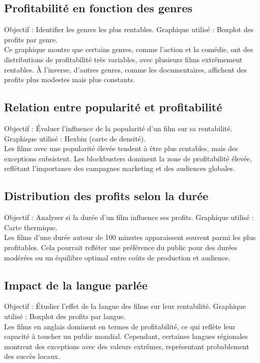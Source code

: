 \documentclass{article}
\begin{document}
\subsection*{Profitabilité en fonction des genres}
Objectif : Identifier les genres les plus rentables.
Graphique utilisé : Boxplot des profits par genre. \\
Ce graphique montre que certains genres, comme l’action et la comédie, ont des distributions de profitabilité très variables, avec plusieurs films extrêmement rentables. À l’inverse, d'autres genres, comme les documentaires, affichent des profits plus modestes mais plus constants.

\subsection*{Relation entre popularité et profitabilité}
Objectif : Évaluer l’influence de la popularité d’un film sur sa rentabilité.
Graphique utilisé : Hexbin (carte de densité).\\
Les films avec une popularité élevée tendent à être plus rentables, mais des exceptions subsistent. Les blockbusters dominent la zone de profitabilité élevée, reflétant l’importance des campagnes marketing et des audiences globales.

\subsection*{Distribution des profits selon la durée}
Objectif : Analyser si la durée d’un film influence ses profits.
Graphique utilisé : Carte thermique.\\
Les films d’une durée autour de 100 minutes apparaissent souvent parmi les plus profitables. Cela pourrait refléter une préférence du public pour des durées modérées ou un équilibre optimal entre coûts de production et audience.

\subsection*{Impact de la langue parlée}
Objectif : Étudier l’effet de la langue des films sur leur rentabilité.
Graphique utilisé : Boxplot des profits par langue.\\
Les films en anglais dominent en termes de profitabilité, ce qui reflète leur capacité à toucher un public mondial. Cependant, certaines langues régionales montrent des exceptions avec des valeurs extrêmes, représentant probablement des succès locaux.
\end{document}
